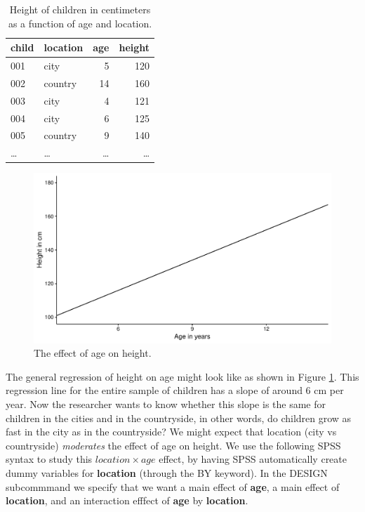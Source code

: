 \documentclass[]{book}\usepackage[]{graphicx}\usepackage[]{color}
\makeatletter
\def\maxwidth{ %
  \ifdim\Gin@nat@width>\linewidth
    \linewidth
  \else
    \Gin@nat@width
  \fi
}
\newenvironment{knitrout}{}{} %
\makeatother
\begin{document}
 \begin{table}
 \caption{Height of children in centimeters as a function of age and location.}
 \begin{tabular}{llrr}
 child & location & age & height\\ \hline
 001 & city & 5 & 120\\
 002 & country & 14 & 160\\
 003 & city & 4 & 121\\
 004 & city & 6 & 125\\
 005 & country & 9 & 140\\
 \dots & \dots & \dots & \dots\\
 \end{tabular}
 \label{tab:location}
 \end{table}



\begin{knitrout}
\color{fgcolor}\begin{figure}

{\centering \includegraphics[width=\maxwidth]{figure/summary_plot1-1} 

}

\caption[The effect of age on height]{The effect of age on height.}\label{fig:summary_plot1}
\end{figure}


\end{knitrout}

The general regression of height on age might look like as shown in Figure \ref{fig:summary_plot1}. This regression line for the entire sample of children has a slope of around 6 cm per year. Now the researcher wants to know whether this slope is the same for children in the cities and in the countryside, in other words, do children grow as fast in the city as in the countryside? We might expect that location (city vs countryside) \textit{moderates} the effect of age on height. We use the following SPSS syntax to study this $location \times age$ effect, by having SPSS automatically create dummy variables for \textbf{location} (through the BY keyword). In the DESIGN subcommmand we specify that we want a main effect of \textbf{age}, a main effect of \textbf{location}, and an interaction efffect of \textbf{age} by \textbf{location}. 
\end{document}
